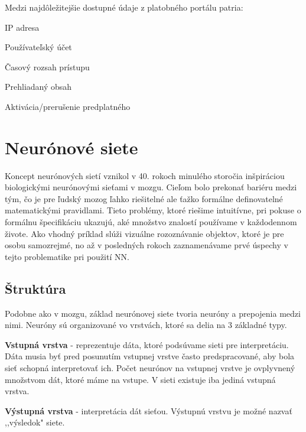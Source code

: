 Medzi najdôležitejšie dostupné údaje z platobného portálu patria:

\begin{my_itemize}
	\item {IP adresa}
	\item {Používateľský účet}
	\item {Časový rozsah prístupu}
	\item {Prehliadaný obsah}
	\item {Aktivácia/prerušenie predplatného}
\end{my_itemize}

\section{Neurónové siete}
\label{analyza_neuronove_siete}

Koncept neurónových sietí vznikol v 40. rokoch minulého storočia inšpiráciou biologickými neurónovými sieťami v mozgu. Cieľom bolo prekonať bariéru medzi tým, čo je pre ľudský mozog ľahko riešitelné ale ťažko formálne definovatelné matematickými pravidlami. Tieto problémy, ktoré riešime intuitívne, pri pokuse o formálnu špecifikáciu ukazujú, aké množstvo znalostí používame v každodennom živote. Ako vhodný príklad slúži vizuálne rozoznávanie objektov, ktoré je pre osobu samozrejmé, no až v posledných rokoch zaznamenávame prvé úspechy v tejto problematike pri použití NN.  

\subsection{Štruktúra}
\label{analyza_struktura_nn}

Podobne ako v mozgu, základ neurónovej siete tvoria neuróny a prepojenia medzi nimi. Neuróny sú organizované vo vrstvách, ktoré sa delia na 3 základné typy. 
\noindent

\textbf{Vstupná vrstva} - reprezentuje dáta, ktoré podsúvame sieti pre interpretáciu. Dáta musia byť pred posunutím vstupnej vrstve často predspracované, aby bola sieť schopná interpretovať ich. Počet neurónov na vstupnej vrstve je ovplyvnený množstvom dát, ktoré máme na vstupe. V sieti existuje iba jediná vstupná vrstva.
\noindent

\textbf{Výstupná vrstva} - interpretácia dát sieťou. Výstupnú vrstvu je možné nazvať ,,výsledok"  siete.
\noindent

